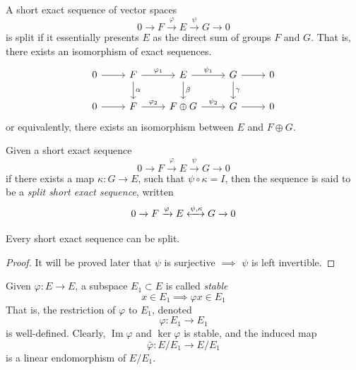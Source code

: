 \documentclass{article}
\DeclareMathOperator{\im}{Im}
\begin{document}
    \begin{proposition}
      A short exact sequence of vector spaces
      \begin{equation}
        0 \xrightarrow{} F \xrightarrow{\varphi} E \xrightarrow{\psi} G \xrightarrow{} 0
      \end{equation}
      is split if it essentially presents $E$ as the direct sum of groups $F$ and $G$. That is, there exists an isomorphism of exact sequences.
      \[\begin{tikzcd}
          0 \arrow{r} & F \arrow{d}{\alpha} \arrow{r}{\varphi_1} & E \arrow{d}{\beta} \arrow{r}{\psi_1} & G \arrow{d}{\gamma} \arrow{r} & 0 \\
          0 \arrow{r} & F \arrow{r}{\varphi_2} & F \oplus G \arrow{r}{\psi_2} & G \arrow{r} & 0 
      \end{tikzcd}\]
      or equivalently, there exists an isomorphism between $E$ and $F \oplus G$. 
    \end{proposition}

    \begin{definition}
      Given a short exact sequence
      \begin{equation}
        0 \xrightarrow{} F \xrightarrow{\varphi} E \xrightarrow{\psi} G \xrightarrow{} 0
      \end{equation}
      if there exists a map $\kappa: G \longrightarrow E$, such that $ \psi \circ \kappa = I$, then the sequence is said to be a \textit{split short exact sequence}, written
      \begin{equation}
        0 \xrightarrow{} F \xrightarrow{\varphi} E \xleftrightarrow{\psi, \kappa} G \xrightarrow{} 0
      \end{equation}
    \end{definition}

    \begin{proposition}
      Every short exact sequence can be split. 
    \end{proposition}
    \begin{proof}
      It will be proved later that $\psi$ is surjective $\implies$ $\psi$ is left invertible. 
    \end{proof}

    \begin{definition}
      Given $\varphi: E \longrightarrow E$, a subspace $E_1 \subset E$ is called \textit{stable} 
      \begin{equation}
        x \in E_1 \implies \varphi x \in E_1
      \end{equation}
      That is, the restriction of $\varphi$ to $E_1$, denoted
      \begin{equation}
        \varphi: E_1 \longrightarrow E_1
      \end{equation}
      is well-defined. Clearly, $\im{\varphi}$ and $\ker{\varphi}$ is stable, and the induced map 
      \begin{equation}
        \bar{\varphi}: E / E_1 \longrightarrow E / E_1
      \end{equation}
      is a linear endomorphism of $E / E_1$. 
    \end{definition}
\end{document}
